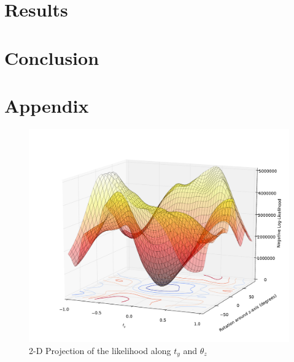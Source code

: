 \documentclass{article} %
\begin{document}
\section{Results}

\section{Conclusion}





\section{Appendix}

\begin{figure}
\includegraphics[width=7in]{LLmap3.pdf}
\caption{2-D Projection of the likelihood along $t_y$ and $\theta_z$}
\label{figure:likelihood}
\end{figure}
\end{document}
